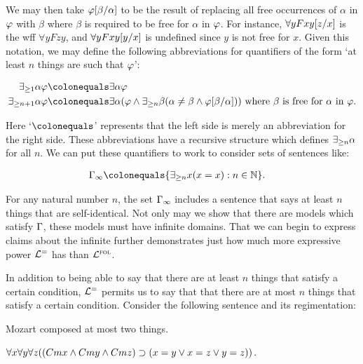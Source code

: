 We may then take $\varphi[\beta/\alpha]$ to be the result of replacing all free occurrences of $\alpha$ in $\varphi$ with $\beta$ where $\beta$ is required to be free for $\alpha$ in $\varphi$. 
For instance, $\forall yFxy[z/x]$ is the wff $\forall yFzy$, and $\forall yFxy[y/x]$ is undefined since $y$ is not free for $x$.
Given this notation, we may define the following abbreviations for quantifiers of the form `at least $n$ things are such that $\varphi$':

\vspace{-.2in}
\begin{align*}
  \qt{\exists_{\geq 1}}{\alpha}\metaA &\colonequals \qt{\exists}{\alpha}\metaA\\ 
  \qt{\exists_{\geq n+1}}{\alpha}\metaA &\colonequals \qt{\exists}{\alpha}(\metaA \eand \qt{\exists_{\geq n}}{\beta}(\alpha \neq \beta \eand \metaA\unisub{\beta}{\alpha})) \text{ where } \beta \text{ is free for } \alpha \text{ in } \metaA.
\end{align*}
\vspace{-.2in}

Here `$\colonequals$' represents that the left side is merely an abbreviation for the right side. 
These abbreviations have a recursive structure which defines $\exists_{\geq n} \alpha$ for all $n$.
We can put these quantifiers to work to consider sets of sentences like:

\vspace{-.2in}
\begin{align*}
  \MetaG_{\infty} &\colonequals \set{\qt{\exists_{\geq n}}{x}(x=x): n\in\mathbb{N}}.
\end{align*}
\vspace{-.2in}

For any natural number $n$, the set $\Gamma_\infty$ includes a sentence that says at least $n$ things that are self-identical.
Not only may we show that there are models which satisfy $\Gamma$, these models must have infinite domains.
That we can begin to express claims about the infinite further demonstrates just how much more expressive power $\mathcal{L}^{=}$ has than $\mathcal{L}^{\textsc{fol}}$. 

In addition to being able to say that there are at least $n$ things that satisfy a certain condition, $\mathcal{L}^{=}$ permits us to say that that there are at most $n$ things that satisfy a certain condition. 
Consider the following sentence and its regimentation:

\begin{earg}
  \item[\ex{Q3}] Mozart composed at most two things.
  \item[\ex{Q4}] $\forall x\forall y\forall z((Cmx \wedge Cmy \wedge Cmz) \supset (x = y \vee x = z \vee y = z))$.
\end{earg}

